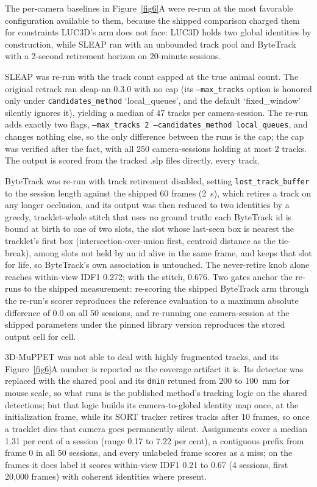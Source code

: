 \documentclass[pdflatex, sn-nature]{sn-jnl}
\theoremstyle{thmstyleone}%
\theoremstyle{thmstyletwo}%
\theoremstyle{thmstylethree}%
\begin{document}
The per-camera baselines in Figure~\ref{fig6}A were re-run at the most favorable configuration available to them, because the shipped comparison charged them for constraints LUC3D's arm does not face: LUC3D holds two global identities by construction, while SLEAP ran with an unbounded track pool and ByteTrack with a 2-second retirement horizon on 20-minute sessions.

SLEAP was re-run with the track count capped at the true animal count. The original retrack ran sleap-nn 0.3.0 with no cap (its \texttt{--max\_tracks} option is honored only under \texttt{candidates\_method} `local\_queues', and the default `fixed\_window' silently ignores it), yielding a median of 47 tracks per camera-session. The re-run adds exactly two flags, \texttt{--max\_tracks 2 --candidates\_method local\_queues}, and changes nothing else, so the only difference between the runs is the cap; the cap was verified after the fact, with all 250 camera-sessions holding at most 2 tracks. The output is scored from the tracked .slp files directly, every track.

ByteTrack was re-run with track retirement disabled, setting \texttt{lost\_track\_buffer} to the session length against the shipped 60 frames (2~s), which retires a track on any longer occlusion, and its output was then reduced to two identities by a greedy, tracklet-whole stitch that uses no ground truth: each ByteTrack id is bound at birth to one of two slots, the slot whose last-seen box is nearest the tracklet's first box (intersection-over-union first, centroid distance as the tie-break), among slots not held by an id alive in the same frame, and keeps that slot for life, so ByteTrack's own association is untouched. The never-retire knob alone reaches within-view IDF1 0.272; with the stitch, 0.676. Two gates anchor the re-runs to the shipped measurement: re-scoring the shipped ByteTrack arm through the re-run's scorer reproduces the reference evaluation to a maximum absolute difference of 0.0 on all 50 sessions, and re-running one camera-session at the shipped parameters under the pinned library version reproduces the stored output cell for cell.

3D-MuPPET was not able to deal with highly fragmented tracks, and its Figure~\ref{fig6}A number is reported as the coverage artifact it is. Its detector was replaced with the shared pool and its \texttt{dmin} retuned from 200 to 100~mm for mouse scale, so what runs is the published method's tracking logic on the shared detections; but that logic builds its camera-to-global identity map once, at the initialization frame, while its SORT tracker retires tracks after 10 frames, so once a tracklet dies that camera goes permanently silent. Assignments cover a median 1.31 per cent of a session (range 0.17 to 7.22 per cent), a contiguous prefix from frame 0 in all 50 sessions, and every unlabeled frame scores as a miss; on the frames it does label it scores within-view IDF1 0.21 to 0.67 (4 sessions, first 20,000 frames) with coherent identities where present.
\end{document}
